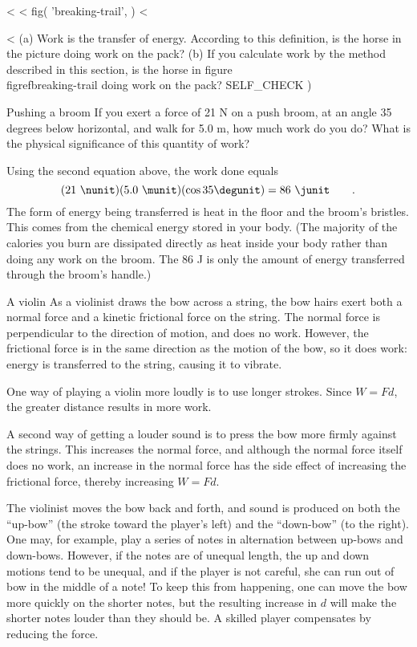 <%
<%
  fig(
    'breaking-trail',
  )
<%

<%
(a) Work is the transfer of energy. According to this
definition, is the horse in the picture doing work on the
pack? (b) If you calculate work by the method described in
this section, is the horse in figure \\figref{breaking-trail} doing work on the pack?
  SELF_CHECK
  ) %

\begin{eg}{Pushing a broom}
\egquestion If you exert a force of 21 N on a push broom, at
an angle 35 degrees below horizontal, and walk for 5.0 m,
how much work do you do? What is the physical significance
of this quantity of work?

\eganswer Using the second equation above, the work done equals
\begin{equation*}
                (21\ \nunit)(5.0\ \munit)(\cos  35\degunit)  =  86\ \junit   \qquad   .
\end{equation*}
The form of energy being transferred is heat in the floor
and the broom's bristles. This comes from the chemical
energy stored in your body. (The majority of the calories
you burn are dissipated directly as heat inside your body
rather than doing any work on the broom. The 86 J is only
the amount of energy transferred through the broom's handle.)
\end{eg}

\begin{eg}{A violin}
As a violinist draws the bow across a string, the bow hairs exert
both a normal force and a kinetic frictional force on the string. The normal
force is perpendicular to the direction of motion, and does no work.
However, the frictional force is in the same direction as the motion
of the bow, so it does work: energy is transferred to the string,
causing it to vibrate.

One way of playing a violin more loudly is to use longer
strokes. Since $W=Fd$, the greater distance results in more work.

A second way of getting a louder sound is to press the bow more
firmly against the strings. This increases the normal force, and
although the normal force itself does no work, an increase in the
normal force has the side effect of increasing the frictional force,
thereby increasing $W=Fd$.

The violinist moves the bow back and forth, and sound is produced on both
the ``up-bow'' (the stroke toward the player's left) and the ``down-bow''
(to the right). One may, for example, play a series of notes in alternation
between up-bows and down-bows. However, if the notes are of unequal length,
the up and down motions tend to be unequal, and if the player is not
careful, she can run out of bow in the middle of a note! To keep this
from happening, one can move the bow more quickly on the shorter notes,
but the resulting increase in $d$ will make the shorter notes louder than
they should be. A skilled player compensates by reducing the force.
\end{eg}


